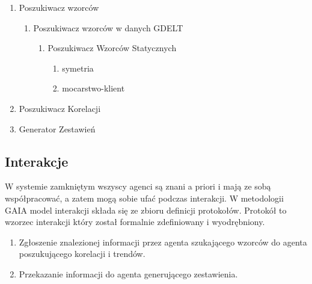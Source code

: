 \documentclass[11pt]{report}
\begin{document}
    \begin{enumerate}
        \item Poszukiwacz wzorców
        \begin{enumerate}
            \item Poszukiwacz wzorców w danych GDELT
            \begin{enumerate}
                \item Poszukiwacz Wzorców Statycznych
                \begin{enumerate}
                    \item symetria
                    \item mocarstwo-klient
                \end{enumerate}
            \end{enumerate}
        \end{enumerate}
        \item Poszukiwacz Korelacji
        \item Generator Zestawień
    \end{enumerate}

    \subsection{Interakcje}
    W systemie zamkniętym wszyscy agenci są znani a priori i mają ze sobą współpracować, a zatem mogą sobie ufać podczas interakcji.
    W metodologii GAIA model interakcji składa się ze zbioru definicji protokołów.
    Protokół to wzorzec interakcji który został formalnie zdefiniowany i wyodrębniony.

    \begin{enumerate}
        \item Zgłoszenie znalezionej informacji przez agenta szukającego wzorców do agenta poszukującego korelacji i trendów.
        \item Przekazanie informacji do agenta generującego zestawienia.
    \end{enumerate}
\end{document}
